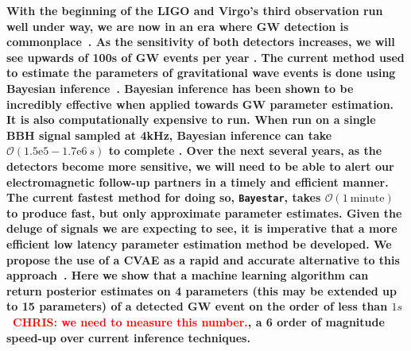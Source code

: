 \documentclass[%
showpacs,
 amsmath,amssymb,
 aps,
 twocolumn,
 prl,
 reprint,
floatfix,
]{revtex4-1}
\newcommand{\chris}[1]{\textcolor{red}{CHRIS: #1}}
\begin{document}
%
%
%
\textbf{ 
%
%
With the beginning of the \ac{LIGO} and
Virgo's third observation run well under way, we are now in an era where
\ac{GW} detection is commonplace~\cite{PhysRevLett.116.061102,
PhysRevX.6.041015,PhysRevLett.119.161101}. As the sensitivity of both detectors
increases, we will see upwards of 100s of \ac{GW} events per year \cite{1409.7215}.  The current
method used to estimate the parameters of gravitational wave events is done
using Bayesian inference~\cite{1409.7215}.
%
%
Bayesian inference has been shown to be incredibly effective when 
applied towards \ac{GW} parameter estimation. It is also computationally expensive 
to run. When run on a single \ac{BBH} signal sampled at 4kHz, Bayesian 
inference can take $\mathcal{O}(1.5\textrm{e}5 - 1.7\textrm{e}6\: s)$ to complete \cite{1409.7215}. 
Over the next several years, as the detectors become more sensitive, we will 
need to be able to alert our electromagnetic follow-up partners in a timely 
and efficient manner. The current fastest method for doing so, \texttt{Bayestar}, 
takes $\mathcal{O}(1\: \textrm{minute})$ to produce fast, but only approximate parameter estimates. 
Given the deluge of signals we are expecting to see, 
it is imperative that a more efficient low latency parameter estimation 
method be developed. We propose the use of a \ac{CVAE} as a rapid and accurate alternative to this
approach~\cite{1904.06264,1812.04405}. 
%
%
Here we show that a machine learning algorithm can return
posterior estimates on 4 parameters (this may be extended up to 15 parameters) of a detected \ac{GW} event on the order of less
than $1s$~\chris{we need to measure this number.}, a 6 order of magnitude speed-up over
current inference techniques.}
\end{document}

